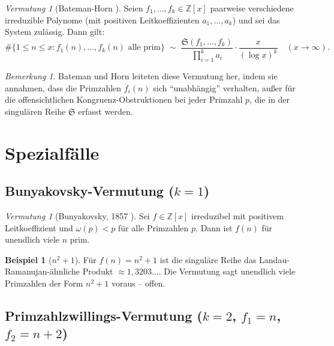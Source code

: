 \documentclass[12pt,a4paper]{amsart}
\theoremstyle{definition}
\newtheorem{example}[theorem]{Beispiel}
\theoremstyle{remark}
\newtheorem{bemerkung}[theorem]{Bemerkung}
\newtheorem{vermutung}[theorem]{Vermutung}
\newcommand{\Z}{\mathbb{Z}}
\newcommand{\BH}{\mathfrak{S}}
\begin{document}
\begin{vermutung}[Bateman-Horn \cite{BH1962}]\label{verm:BH}
  Seien $f_1, \ldots, f_k \in \Z[x]$ paarweise verschiedene irreduzible Polynome
  (mit positiven Leitkoeffizienten $a_1, \ldots, a_k$) und sei das System zulässig.
  Dann gilt:
  \[
    \#\{1 \leq n \leq x : f_1(n),\ldots,f_k(n) \text{ alle prim}\}
    \;\sim\;
    \frac{\BH(f_1,\ldots,f_k)}{\prod_{i=1}^k a_i}
    \cdot \frac{x}{(\log x)^k}
    \quad (x \to \infty).
  \]
\end{vermutung}

\begin{bemerkung}
  Bateman und Horn leiteten diese Vermutung her, indem sie annahmen, dass die Primzahlen
  $f_i(n)$ sich ``unabhängig'' verhalten, außer für die offensichtlichen
  Kongruenz-Obstruktionen bei jeder Primzahl $p$, die in der singulären Reihe
  $\BH$ erfasst werden.
\end{bemerkung}

\section{Spezialfälle}\label{sec:spezialfaelle}

\subsection{Bunyakovsky-Vermutung ($k=1$)}

\begin{vermutung}[Bunyakovsky, 1857 \cite{Bunyakovsky1857}]\label{verm:bunyakovsky}
  Sei $f \in \Z[x]$ irreduzibel mit positivem Leitkoeffizient und $\omega(p) < p$ für
  alle Primzahlen $p$. Dann ist $f(n)$ für unendlich viele $n$ prim.
\end{vermutung}

\begin{example}[$n^2+1$]
  Für $f(n) = n^2+1$ ist die singuläre Reihe das Landau-Ramanujan-ähnliche Produkt
  $\approx 1{,}3203\ldots$. Die Vermutung sagt unendlich viele Primzahlen der Form
  $n^2+1$ voraus -- offen.
\end{example}

\subsection{Primzahlzwillings-Vermutung ($k=2$, $f_1=n$, $f_2=n+2$)}
\end{document}
